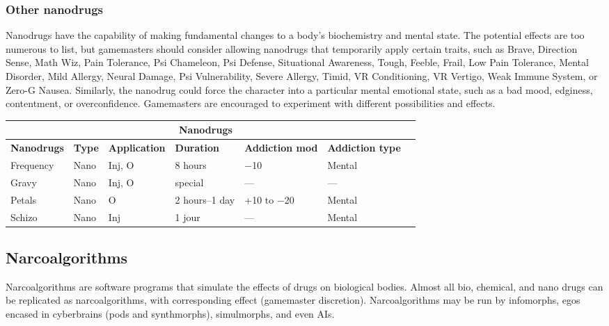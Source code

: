 {{\subsubsection{Other nanodrugs} 

Nanodrugs have the capability of making fundamental changes to a body’s biochemistry and mental state. The potential effects are too numerous to list, but gamemasters should consider allowing nanodrugs that temporarily apply certain traits, such as Brave, Direction Sense, Math Wiz, Pain Tolerance, Psi Chameleon, Psi Defense, Situational Awareness, Tough, Feeble, Frail, Low Pain Tolerance, Mental Disorder, Mild Allergy, Neural Damage, Psi Vulnerability, Severe Allergy, Timid, VR Conditioning, VR Vertigo, Weak Immune System, or Zero-G Nausea. Similarly, the nanodrug could force the character into a particular mental emotional state, such as a bad mood, edginess, contentment, or overconfidence. Gamemasters are encouraged to experiment with different possibilities and effects. 

\hspace{1cm} 

\begin{tabular}{|l|l|l|l|l|l|l|} \hline

\multicolumn{6}{|c|}{\textbf{Nanodrugs}}	\\ \hline

\textbf{Nanodrugs}	&\textbf{Type}	&\textbf{Application}	&\textbf{Duration}	&\textbf{Addiction mod}	&\textbf{Addiction type} \\ \hline

Frequency	&Nano	&Inj, O	&8 hours &$-$10	&Mental \\ \hline

Gravy	&Nano	&Inj, O	&special &--- &--- \\ \hline

Petals	&Nano	&O	&2 hours--1 day	&+10 to $-$20	&Mental \\ \hline

Schizo	&Nano	&Inj	&1 jour	&--- &Mental \\ \hline

\end{tabular} \label{tab:nanodrugs} 



\subsection{Narcoalgorithms} \label{sec:narcoalgorithms} 

Narcoalgorithms are software programs that simulate the effects of drugs on biological bodies. Almost all bio, chemical, and nano drugs can be replicated as narcoalgorithms, with corresponding effect (gamemaster discretion). Narcoalgorithms may be run by infomorphs, egos encased in cyberbrains (pods and synthmorphs), simulmorphs, and even AIs. 

}}
